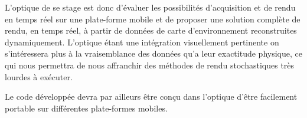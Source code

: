 \documentclass[10pt,a4paper,twoside, twocolumn]{report}
\newcommand*{\rootPath}{../}
\begin{document}
L'optique de se stage est donc d'évaluer les possibilités d'acquisition et de rendu en temps réel sur une plate-forme mobile et de proposer une solution complète de rendu, en temps réel, à partir de données de carte d'environnement reconstruites dynamiquement. L'optique étant une intégration visuellement pertinente on s’intéressera plus à la vraisemblance des données qu'a leur exactitude physique, ce qui nous permettra de nous affranchir des méthodes de rendu stochastiques très lourdes à exécuter.

Le code développée devra par ailleurs être conçu dans l'optique d'être facilement portable sur différentes plate-formes mobiles.


\ifstandalone
	
	
\fi
\end{document}
